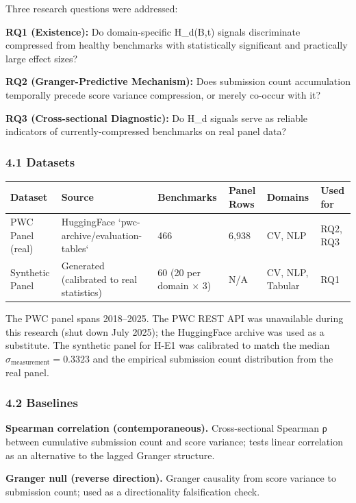 
Three research questions were addressed:

\textbf{RQ1 (Existence):} Do domain-specific H_d(B,t) signals discriminate compressed from healthy benchmarks with statistically significant and practically large effect sizes?

\textbf{RQ2 (Granger-Predictive Mechanism):} Does submission count accumulation temporally precede score variance compression, or merely co-occur with it?

\textbf{RQ3 (Cross-sectional Diagnostic):} Do H_d signals serve as reliable indicators of currently-compressed benchmarks on real panel data?

\subsubsection{4.1 Datasets}

\begin{table}[htbp]
\centering
\begin{tabular}{llllll}
\toprule
Dataset & Source & Benchmarks & Panel Rows & Domains & Used for \\
\midrule
PWC Panel (real) & HuggingFace `pwc-archive/evaluation-tables` & 466 & 6,938 & CV, NLP & RQ2, RQ3 \\
Synthetic Panel & Generated (calibrated to real statistics) & 60 (20 per domain × 3) & N/A & CV, NLP, Tabular & RQ1 \\
\bottomrule
\end{tabular}
\end{table}

The PWC panel spans 2018–2025. The PWC REST API was unavailable during this research (shut down July 2025); the HuggingFace archive was used as a substitute. The synthetic panel for H-E1 was calibrated to match the median $\hat{\sigma}_{\text{measurement}} = 0.3323$ and the empirical submission count distribution from the real panel.

\subsubsection{4.2 Baselines}

\textbf{Spearman correlation (contemporaneous).} Cross-sectional Spearman ρ between cumulative submission count and score variance; tests linear correlation as an alternative to the lagged Granger structure.

\textbf{Granger null (reverse direction).} Granger causality from score variance to submission count; used as a directionality falsification check.


